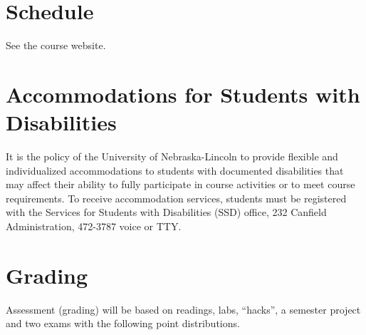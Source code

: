 \documentclass[12pt]{scrartcl}
\begin{document}
\section{Schedule}

See the course website.

\section{Accommodations for Students with Disabilities}


It is the policy of the University of Nebraska-Lincoln to 
provide flexible and individualized accommodations to students 
with documented disabilities that may affect their ability to 
fully participate in course activities or to meet course 
requirements.  To receive accommodation services, students 
must be registered with the Services for Students with 
Disabilities (SSD) office, 232 Canfield Administration, 
472-3787 voice or TTY.

%

\section{Grading}

Assessment (grading) will be based on readings, labs, 
``hacks'', a semester project and two exams 
with the following point distributions.
\end{document}
